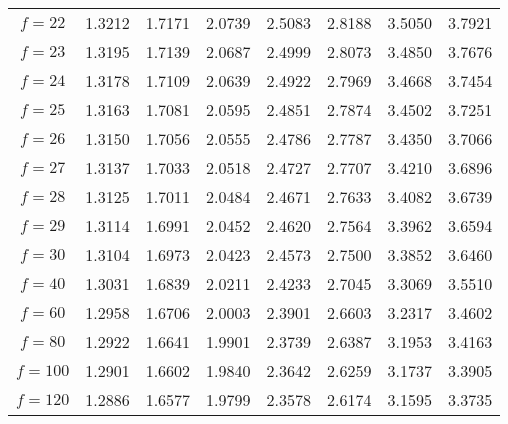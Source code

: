 \documentclass{article}
\begin{document}
\begin{tabular}{c|ccccccc}
$f= 22$ & 1.3212 & 1.7171 & 2.0739 & 2.5083 & 2.8188 & 3.5050 & 3.7921\\
$f= 23$ & 1.3195 & 1.7139 & 2.0687 & 2.4999 & 2.8073 & 3.4850 & 3.7676\\
$f= 24$ & 1.3178 & 1.7109 & 2.0639 & 2.4922 & 2.7969 & 3.4668 & 3.7454\\
$f= 25$ & 1.3163 & 1.7081 & 2.0595 & 2.4851 & 2.7874 & 3.4502 & 3.7251\\
$f= 26$ & 1.3150 & 1.7056 & 2.0555 & 2.4786 & 2.7787 & 3.4350 & 3.7066\\
$f= 27$ & 1.3137 & 1.7033 & 2.0518 & 2.4727 & 2.7707 & 3.4210 & 3.6896\\
$f= 28$ & 1.3125 & 1.7011 & 2.0484 & 2.4671 & 2.7633 & 3.4082 & 3.6739\\
$f= 29$ & 1.3114 & 1.6991 & 2.0452 & 2.4620 & 2.7564 & 3.3962 & 3.6594\\
$f= 30$ & 1.3104 & 1.6973 & 2.0423 & 2.4573 & 2.7500 & 3.3852 & 3.6460\\ \hline
$f= 40$ & 1.3031 & 1.6839 & 2.0211 & 2.4233 & 2.7045 & 3.3069 & 3.5510\\
$f= 60$ & 1.2958 & 1.6706 & 2.0003 & 2.3901 & 2.6603 & 3.2317 & 3.4602\\
$f= 80$ & 1.2922 & 1.6641 & 1.9901 & 2.3739 & 2.6387 & 3.1953 & 3.4163\\
$f=100$ & 1.2901 & 1.6602 & 1.9840 & 2.3642 & 2.6259 & 3.1737 & 3.3905\\
$f=120$ & 1.2886 & 1.6577 & 1.9799 & 2.3578 & 2.6174 & 3.1595 & 3.3735\\

\end{tabular}



\label{LastPageNo}
\end{document}
